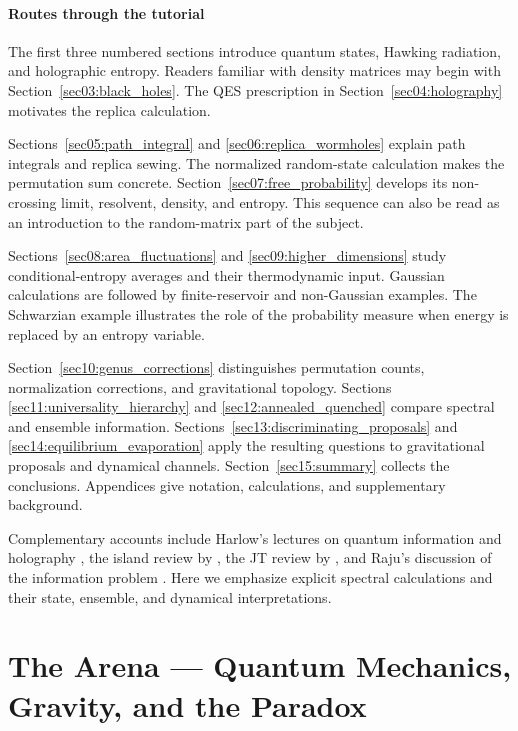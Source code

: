\documentclass[11pt,letterpaper]{article}
\theoremstyle{plain}
\theoremstyle{definition}
\theoremstyle{remark}
\begin{document}
\subsection*{Routes through the tutorial}

The first three numbered sections introduce quantum states, Hawking radiation,
and holographic entropy. Readers familiar with density matrices may begin
with Section~\ref{sec03:black_holes}. The QES prescription in
Section~\ref{sec04:holography} motivates the replica calculation.

Sections~\ref{sec05:path_integral} and \ref{sec06:replica_wormholes} explain
path integrals and replica sewing. The normalized random-state calculation
makes the permutation sum concrete. Section~\ref{sec07:free_probability}
develops its non-crossing limit, resolvent, density, and entropy. This sequence
can also be read as an introduction to the random-matrix part of the subject.

Sections~\ref{sec08:area_fluctuations} and \ref{sec09:higher_dimensions}
study conditional-entropy averages and their thermodynamic input. Gaussian
calculations are followed by finite-reservoir and non-Gaussian examples.
The Schwarzian example illustrates the role of the probability measure when
energy is replaced by an entropy variable.

Section~\ref{sec10:genus_corrections} distinguishes permutation counts,
normalization corrections, and gravitational topology. Sections
\ref{sec11:universality_hierarchy} and \ref{sec12:annealed_quenched} compare
spectral and ensemble information. Sections~\ref{sec13:discriminating_proposals}
and \ref{sec14:equilibrium_evaporation} apply the resulting questions to
gravitational proposals and dynamical channels. Section~\ref{sec15:summary}
collects the conclusions. Appendices give notation, calculations, and
supplementary background.

Complementary accounts include Harlow's lectures on quantum information and
holography \citep{harlow2016}, the island review by \citet{ahmstetal2021},
the JT review by \citet{mertensturiaci2023}, and Raju's discussion of the
information problem \citep{raju2022}. Here we emphasize explicit spectral
calculations and their state, ensemble, and dynamical interpretations.


\part{The Arena --- Quantum Mechanics, Gravity, and the Paradox}
\end{document}
